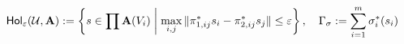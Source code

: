 \documentclass[preview]{standalone}
\begin{document}
\begin{align*}
\special{dvisvgm:raw <g id='unique000'>}\mathsf{Hol}_\varepsilon(\mathcal{U},\mathbf{A}) := \left\{s\in\prod\mathbf{A}(V_i) \;\middle|\; \max_{i,j}\|\pi_{1,ij}^*s_i - \pi_{2,ij}^*s_j\| \le \varepsilon\right\}, \quad \Gamma_\sigma := \sum_{i=1}^m \sigma_i^*(s_i)\special{dvisvgm:raw </g>}
\end{align*}
\end{document}
